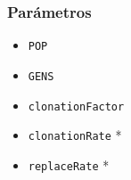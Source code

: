 \frame
{
\frametitle{Parámetros}
\begin{itemize}
    \item \texttt{POP} \blue{[10,210]}
    \item \texttt{GENS} \blue{[10,2000,30]}
    \item \texttt{clonationFactor} \blue{[0,1]} 
    \item \texttt{clonationRate}   \blue{[0,1]} *
    \item \texttt{replaceRate}     \blue{[0,1]} *
\end{itemize}
}
